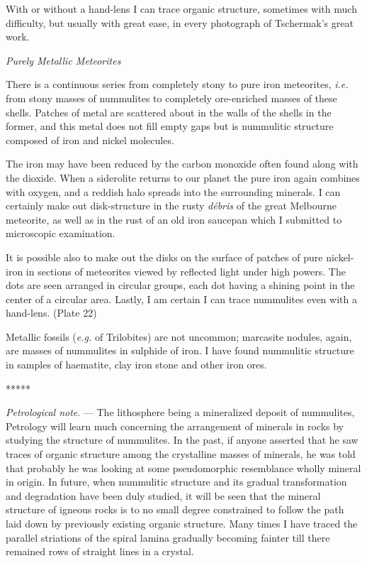 \documentclass[a4paper, 12pt, oneside]{article}
\begin{document}
With or without a hand-lens I can trace organic structure, sometimes with much difficulty, but usually with great ease, in every photograph of Tschermak's great work.

\bigskip
\centerline{\emph{Purely Metallic Meteorites}}

There is a continuous series from completely stony to pure iron meteorites, \emph{i.e.} from stony masses of nummulites to completely ore-enriched masses of these shells. Patches of metal are scattered about in the walls of the shells in the former, and this metal does not fill empty gaps but is nummulitic structure composed of iron and nickel molecules.

The iron may have been reduced by the carbon monoxide often found along with the dioxide. When a siderolite returns to our planet the pure iron again combines with oxygen, and a reddish halo spreads into the surrounding minerals. I can certainly make out disk-structure in the rusty \emph{débris} of the great Melbourne meteorite, as well as in the rust of an old iron saucepan which I submitted to microscopic examination.

It is possible also to make out the disks on the surface of patches of pure nickel-iron in sections of meteorites viewed by reflected light under high powers. The dots are seen arranged in circular groups, each dot having a shining point in the center of a circular area. Lastly, I am certain I can trace nummulites even with a hand-lens. (Plate 22)

Metallic fossils (\emph{e.g.} of Trilobites) are not uncommon; marcasite nodules, again, are masses of nummulites in sulphide of iron. I have found nummulitic structure in samples of haematite, clay iron stone and other iron ores.

\centerline{*\hspace{15mm}*\hspace{15mm}*\hspace{15mm}*\hspace{15mm}*}
\bigskip

\emph{Petrological note}. --- The lithosphere being a mineralized deposit of nummulites, Petrology will learn much concerning the arrangement of minerals in rocks by studying the structure of nummulites. In the past, if anyone asserted that he saw traces of organic structure among the crystalline masses of minerals, he was told that probably he was looking at some pseudomorphic resemblance wholly mineral in origin. In future, when nummulitic structure and its gradual transformation and degradation have been duly studied, it will be seen that the mineral structure of igneous rocks is to no small degree constrained to follow the path laid down by previously existing organic structure. Many times I have traced the parallel striations of the spiral lamina gradually becoming fainter till there remained rows of straight lines in a crystal.
\end{document}
